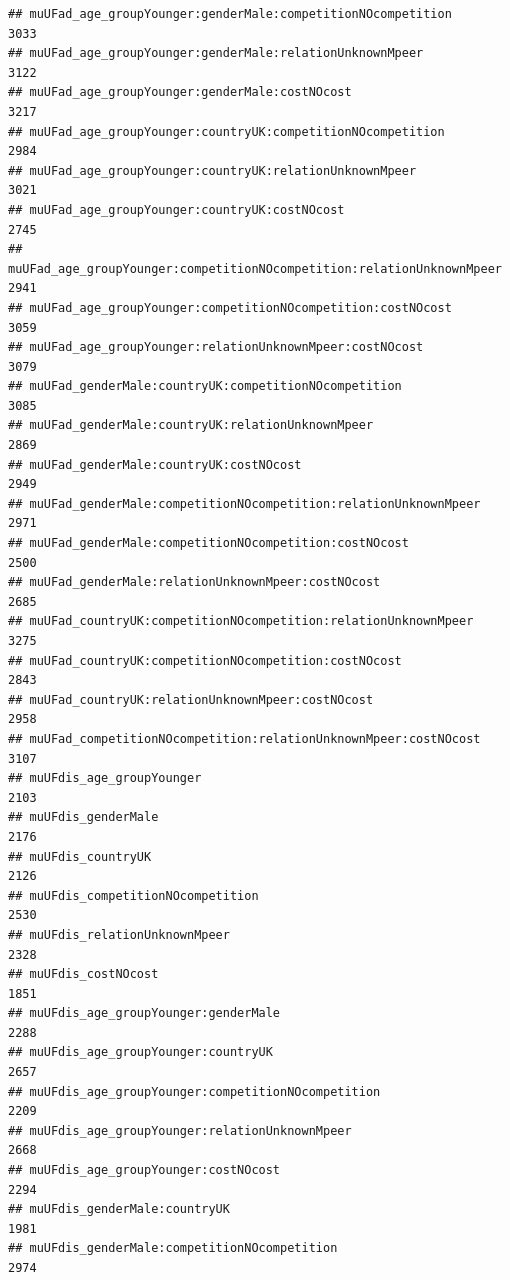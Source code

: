 \documentclass[
]{article}
\begin{document}
\begin{verbatim}
## muUFad_age_groupYounger:genderMale:competitionNOcompetition                3033
## muUFad_age_groupYounger:genderMale:relationUnknownMpeer                    3122
## muUFad_age_groupYounger:genderMale:costNOcost                              3217
## muUFad_age_groupYounger:countryUK:competitionNOcompetition                 2984
## muUFad_age_groupYounger:countryUK:relationUnknownMpeer                     3021
## muUFad_age_groupYounger:countryUK:costNOcost                               2745
## muUFad_age_groupYounger:competitionNOcompetition:relationUnknownMpeer      2941
## muUFad_age_groupYounger:competitionNOcompetition:costNOcost                3059
## muUFad_age_groupYounger:relationUnknownMpeer:costNOcost                    3079
## muUFad_genderMale:countryUK:competitionNOcompetition                       3085
## muUFad_genderMale:countryUK:relationUnknownMpeer                           2869
## muUFad_genderMale:countryUK:costNOcost                                     2949
## muUFad_genderMale:competitionNOcompetition:relationUnknownMpeer            2971
## muUFad_genderMale:competitionNOcompetition:costNOcost                      2500
## muUFad_genderMale:relationUnknownMpeer:costNOcost                          2685
## muUFad_countryUK:competitionNOcompetition:relationUnknownMpeer             3275
## muUFad_countryUK:competitionNOcompetition:costNOcost                       2843
## muUFad_countryUK:relationUnknownMpeer:costNOcost                           2958
## muUFad_competitionNOcompetition:relationUnknownMpeer:costNOcost            3107
## muUFdis_age_groupYounger                                                   2103
## muUFdis_genderMale                                                         2176
## muUFdis_countryUK                                                          2126
## muUFdis_competitionNOcompetition                                           2530
## muUFdis_relationUnknownMpeer                                               2328
## muUFdis_costNOcost                                                         1851
## muUFdis_age_groupYounger:genderMale                                        2288
## muUFdis_age_groupYounger:countryUK                                         2657
## muUFdis_age_groupYounger:competitionNOcompetition                          2209
## muUFdis_age_groupYounger:relationUnknownMpeer                              2668
## muUFdis_age_groupYounger:costNOcost                                        2294
## muUFdis_genderMale:countryUK                                               1981
## muUFdis_genderMale:competitionNOcompetition                                2974

\end{verbatim}
\end{document}
